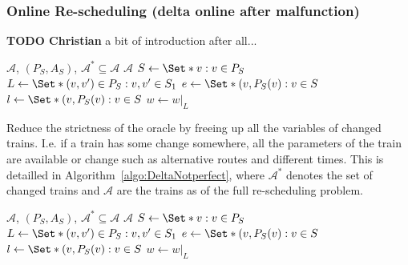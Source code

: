 \documentclass{article}
\begin{document}
\subsubsection{Online Re-scheduling (delta online after malfunction)}\label{subsubsec:Deltaonline}




\begin{mdframed}
{\bf TODO Christian} a bit of introduction after all...
\end{mdframed}


\begin{algorithm}
	\caption{$transmissionchains$} \label{algo:naive}
	\begin{algorithmic}[1]
		\Require $\mathcal{A}$, $(P_S,A_S)$, $\mathcal{A}^*\subseteq\mathcal{A}$
	    \Ensure $\mathcal{A}$
	        \State $S \leftarrow \Set*{v: v\in P_{S}}$
	        \State $L \leftarrow \Set*{(v,v^\prime) \in P_{S}: v,v^\prime \in S_1}$
	        \State $e \leftarrow \Set*{(v,P_S(v): v\in S}$
	        \State $l \leftarrow \Set*{(v,P_S(v): v\in S}$
	        \State $w \leftarrow w \vert_{L}$
	    \EndFor
	\end{algorithmic} 
\end{algorithm}


Reduce the strictness of the oracle by freeing up all the variables of changed trains. I.e. if a train has some change somewhere, all the parameters of the train are available or change such as alternative routes and different times. This is detailled in Algorithm~\ref{algo:DeltaNotperfect}, where $\mathcal{A}^*$ denotes the set of changed trains and $\mathcal{A}$ are the trains as of the full re-scheduling problem.


\begin{algorithm}
	\caption{$Delta_{notsoperfect}$} \label{algo:DeltaNotperfect}
	\begin{algorithmic}[1]
		\Require $\mathcal{A}$, $(P_S,A_S)$, $\mathcal{A}^*\subseteq\mathcal{A}$
	    \Ensure $\mathcal{A}$
	        \State $S \leftarrow \Set*{v: v\in P_{S}}$
	        \State $L \leftarrow \Set*{(v,v^\prime) \in P_{S}: v,v^\prime \in S_1}$
	        \State $e \leftarrow \Set*{(v,P_S(v): v\in S}$
	        \State $l \leftarrow \Set*{(v,P_S(v): v\in S}$
	        \State $w \leftarrow w \vert_{L}$
	    \EndFor
	\end{algorithmic} 
\end{algorithm}
\end{document}
